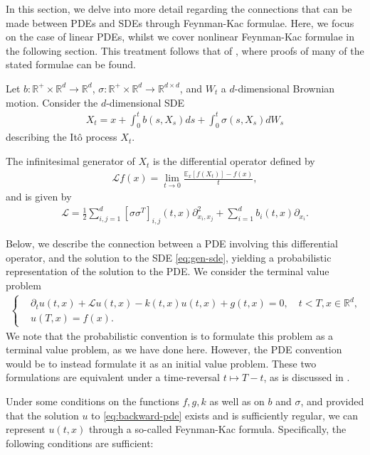 In this section, we delve into more detail regarding the connections that can be made between PDEs and SDEs through Feynman-Kac formulae. Here, we focus on the case of linear PDEs, whilst we cover nonlinear Feynman-Kac formulae in the following section. This treatment follows that of \cite{gobet2016monte}, where proofs of many of the stated formulae can be found. 

Let $b:\mathbb{R}^+ \times \mathbb{R}^d \rightarrow \mathbb{R}^d$, $\sigma:\mathbb{R}^+ \times \mathbb{R}^d \rightarrow \mathbb{R}^{d \times d}$, and $W_t$ a $d$-dimensional Brownian motion. Consider the $d$-dimensional SDE
%
\begin{align}
    \label{eq:gen-sde}
X_t = x + \int_0^t b(s,X_s) ds + \int_0^t \sigma(s,X_s)dW_s
\end{align}
%
describing the Itô process $X_t$. 

The infinitesimal generator of $X_t$ is the differential operator defined by 
%
\begin{align} 
    \mathcal{L}f(x) = \lim_{t\rightarrow 0} \frac{\mathbb{E}_x[f(X_t)]-f(x)}{t},
\end{align}
%
and is given by
%
\begin{align}
    \label{eq:generator-operator}
    \mathcal{L} = \frac{1}{2} \sum_{i,j=1}^d [\sigma \sigma^T]_{i,j}(t,x) \partial_{x_i,x_j}^2 + \sum_{i=1}^d b_i(t,x) \partial_{x_i}.
\end{align}
%

Below, we describe the connection between a PDE involving this differential operator, and the solution to the SDE \autoref{eq:gen-sde}, yielding a probabilistic representation of the solution to the PDE. We consider the terminal value problem
%
\begin{align}
    \label{eq:backward-pde}
    \begin{cases}
    &\partial_t u(t,x) + \mathcal{L}u(t,x) - k(t,x)u(t,x) + g(t,x) = 0, \quad t<T,x \in \mathbb{R}^d, \\
    &u(T,x) = f(x).
    \end{cases}
\end{align}
%
We note that the probabilistic convention is to formulate this problem as a terminal value problem, as we have done here. However, the PDE convention would be to instead formulate it as an initial value problem. These two formulations are equivalent under a time-reversal $t \mapsto T-t$, as is discussed in \cite{gobet2016monte}. 

Under some conditions on the functions $f, g, k$ as well as on $b$ and $\sigma$, and provided that the solution $u$ to \autoref{eq:backward-pde} exists and is sufficiently regular, we can represent $u(t,x)$ through a so-called Feynman-Kac formula. Specifically, the following conditions are sufficient:


